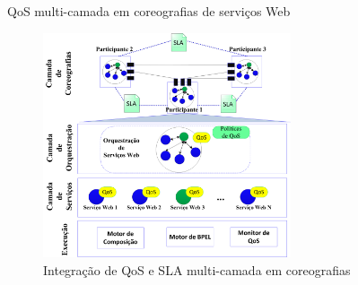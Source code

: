 \documentclass[xcolor=svgnames]{beamer}
\begin{document}
  \begin{frame} {QoS multi-camada em coreografias de serviços Web}
          \begin{figure}[!h]
              \centering
              \includegraphics[width=0.65\textwidth]{./figures/Choreography-MultiTier.png}
              \caption{Integração de QoS e SLA multi-camada em coreografias } %
          \end{figure}	
  \end{frame}



\end{document}
